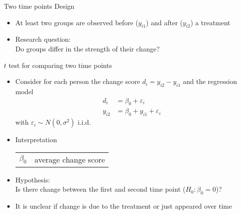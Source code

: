 \documentclass{beamer}
\begin{document}
\begin{frame}{Two time points}
Design
\begin{itemize}
    \item At least two groups are observed before ($y_{i1}$) and after
      ($y_{i2}$) a treatment
        \begin{center}
        \end{center}
      \item Research question:\\
      Do groups differ in the strength of their change?
\end{itemize}
\end{frame}

\begin{frame}{$t$ test for comparing two time points}
\begin{itemize}
  \item Consider for each person the change score $d_i = y_{i2} - y_{i1}$
    and the regression model
    \begin{align*}
         d_i &= \beta_0 + \varepsilon_i \\
      y_{i2} &= \beta_0 + y_{i1} + \varepsilon_i
    \end{align*}
    with $\varepsilon_i \sim N(0, \sigma^2)$ i.i.d.
  \item Interpretation
    \begin{center}
    \begin{tabular}{ll}
    $\beta_0$ & average change score
    \end{tabular}
    \end{center}
  \item Hypothesis:\\
        Is there change between the first and second time point ($H_0\colon \beta_0 = 0$)?
  \item It is unclear if change is due to the treatment or just appeared
    over time
\end{itemize}
\end{frame}
\end{document}
